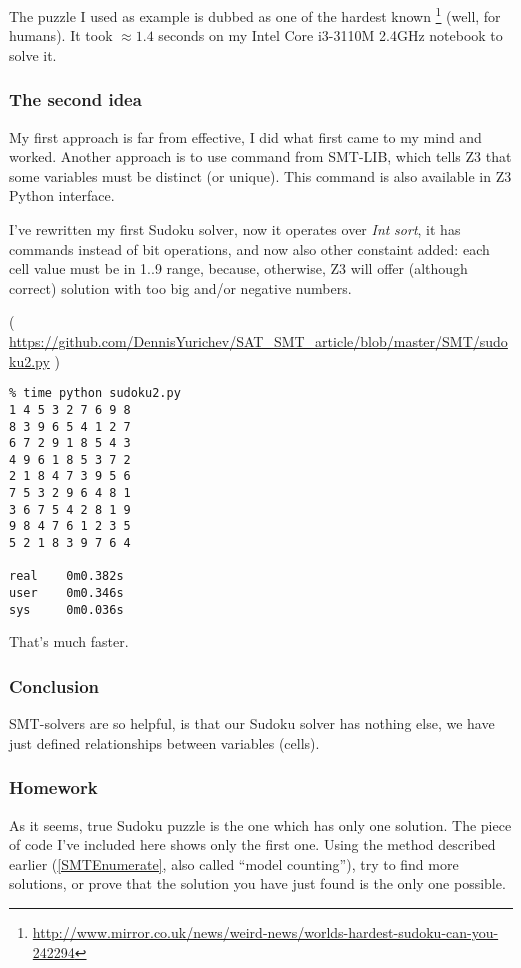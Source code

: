 The puzzle I used as example is dubbed as one of the hardest known
\footnote{\url{http://www.mirror.co.uk/news/weird-news/worlds-hardest-sudoku-can-you-242294}} (well, for humans).
It took $\approx 1.4$ seconds on my Intel Core i3-3110M 2.4GHz notebook to solve it.

\subsubsection{The second idea}

My first approach is far from effective, I did what first came to my mind and worked.
Another approach is to use  command from SMT-LIB, which tells Z3 that some variables must be distinct (or unique).
This command is also available in Z3 Python interface.

I've rewritten my first Sudoku solver, now it operates over \textit{Int} \textit{sort}, it has  commands instead of bit operations,
and now also other constaint added: each cell value must be in 1..9 range, because, otherwise, Z3 will offer (although correct) solution with too big
and/or negative numbers.


( \url{https://github.com/DennisYurichev/SAT_SMT_article/blob/master/SMT/sudoku2.py} )

\begin{lstlisting}
% time python sudoku2.py
1 4 5 3 2 7 6 9 8
8 3 9 6 5 4 1 2 7
6 7 2 9 1 8 5 4 3
4 9 6 1 8 5 3 7 2
2 1 8 4 7 3 9 5 6
7 5 3 2 9 6 4 8 1
3 6 7 5 4 2 8 1 9
9 8 4 7 6 1 2 3 5
5 2 1 8 3 9 7 6 4

real    0m0.382s
user    0m0.346s
sys     0m0.036s
\end{lstlisting}

That's much faster.

\subsubsection{Conclusion}

\ac{SMT}-solvers are so helpful, is that our Sudoku solver has nothing else, we have just defined relationships between variables (cells).

\subsubsection{Homework}

As it seems, true Sudoku puzzle is the one which has only one solution.
The piece of code I've included here shows only the first one.
Using the method described earlier (\ref{SMTEnumerate}, also called ``model counting''), 
try to find more solutions, or prove that the solution you have just found is the only one possible.

